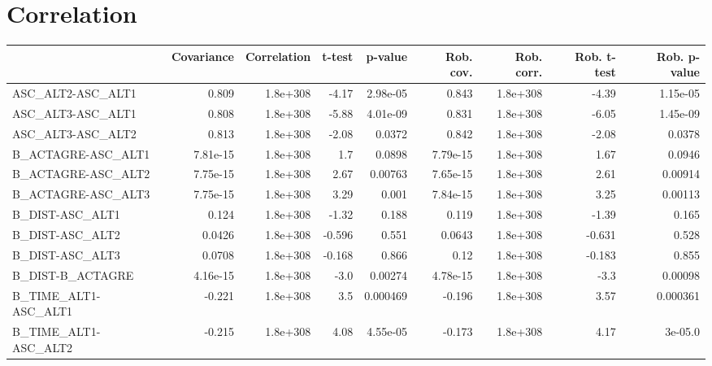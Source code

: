 \section{Correlation}
\begin{tabular}{lrrrrrrrr}
\toprule
{} &  Covariance &  Correlation &    t-test &  p-value &  Rob. cov. &  Rob. corr. &  Rob. t-test &  Rob. p-value \\
\midrule
ASC\_ALT2-ASC\_ALT1                 &       0.809 &     1.8e+308 &     -4.17 & 2.98e-05 &      0.843 &    1.8e+308 &        -4.39 &      1.15e-05 \\
ASC\_ALT3-ASC\_ALT1                 &       0.808 &     1.8e+308 &     -5.88 & 4.01e-09 &      0.831 &    1.8e+308 &        -6.05 &      1.45e-09 \\
ASC\_ALT3-ASC\_ALT2                 &       0.813 &     1.8e+308 &     -2.08 &   0.0372 &      0.842 &    1.8e+308 &        -2.08 &        0.0378 \\
B\_ACTAGRE-ASC\_ALT1                &    7.81e-15 &     1.8e+308 &       1.7 &   0.0898 &   7.79e-15 &    1.8e+308 &         1.67 &        0.0946 \\
B\_ACTAGRE-ASC\_ALT2                &    7.75e-15 &     1.8e+308 &      2.67 &  0.00763 &   7.65e-15 &    1.8e+308 &         2.61 &       0.00914 \\
B\_ACTAGRE-ASC\_ALT3                &    7.75e-15 &     1.8e+308 &      3.29 &    0.001 &   7.84e-15 &    1.8e+308 &         3.25 &       0.00113 \\
B\_DIST-ASC\_ALT1                   &       0.124 &     1.8e+308 &     -1.32 &    0.188 &      0.119 &    1.8e+308 &        -1.39 &         0.165 \\
B\_DIST-ASC\_ALT2                   &      0.0426 &     1.8e+308 &    -0.596 &    0.551 &     0.0643 &    1.8e+308 &       -0.631 &         0.528 \\
B\_DIST-ASC\_ALT3                   &      0.0708 &     1.8e+308 &    -0.168 &    0.866 &       0.12 &    1.8e+308 &       -0.183 &         0.855 \\
B\_DIST-B\_ACTAGRE                  &    4.16e-15 &     1.8e+308 &      -3.0 &  0.00274 &   4.78e-15 &    1.8e+308 &         -3.3 &       0.00098 \\
B\_TIME\_ALT1-ASC\_ALT1              &      -0.221 &     1.8e+308 &       3.5 & 0.000469 &     -0.196 &    1.8e+308 &         3.57 &      0.000361 \\
B\_TIME\_ALT1-ASC\_ALT2              &      -0.215 &     1.8e+308 &      4.08 & 4.55e-05 &     -0.173 &    1.8e+308 &         4.17 &       3e-05.0 \\

\end{tabular}
